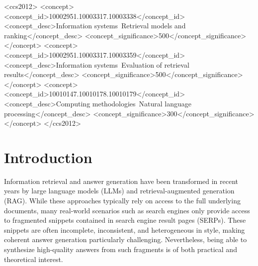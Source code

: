\documentclass[manuscript,screen]{acmart}
\begin{document}
\begin{CCSXML}
\begin{CCSXML}
<ccs2012>
   <concept>
       <concept_id>10002951.10003317.10003338</concept_id>
       <concept_desc>Information systems~Retrieval models and ranking</concept_desc>
       <concept_significance>500</concept_significance>
       </concept>
   <concept>
       <concept_id>10002951.10003317.10003359</concept_id>
       <concept_desc>Information systems~Evaluation of retrieval results</concept_desc>
       <concept_significance>500</concept_significance>
       </concept>
   <concept>
       <concept_id>10010147.10010178.10010179</concept_id>
       <concept_desc>Computing methodologies~Natural language processing</concept_desc>
       <concept_significance>300</concept_significance>
       </concept>
 </ccs2012>
\end{CCSXML}




\maketitle

\section{Introduction}
\label{sec:introduction}

Information retrieval and answer generation have been transformed in recent years by large language models (LLMs) and retrieval-augmented generation (RAG). While these approaches typically rely on access to the full underlying documents, many real-world scenarios such as search engines only provide access to fragmented snippets contained in search engine result pages (SERPs). These snippets are often incomplete, inconsistent, and heterogeneous in style, making coherent answer generation particularly challenging. Nevertheless, being able to synthesize high-quality answers from such fragments is of both practical and theoretical interest.


\end{CCSXML}
\end{document}
